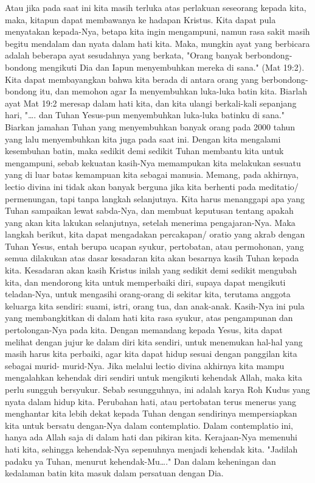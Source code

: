 Atau jika pada saat ini kita masih terluka atas perlakuan seseorang kepada kita, maka, kitapun dapat membawanya ke hadapan Kristus. Kita dapat pula menyatakan kepada-Nya, betapa kita ingin mengampuni, namun rasa sakit masih begitu mendalam dan nyata dalam hati kita. Maka, mungkin ayat yang berbicara adalah beberapa ayat sesudahnya yang berkata, "Orang banyak berbondong-bondong mengikuti Dia dan Iapun menyembuhkan mereka di sana." (Mat 19:2). Kita dapat membayangkan bahwa kita berada di antara orang yang berbondong-bondong itu, dan memohon agar Ia menyembuhkan luka-luka batin kita. Biarlah ayat Mat 19:2 meresap dalam hati kita, dan kita ulangi berkali-kali sepanjang hari, "…. dan Tuhan Yesus-pun menyembuhkan luka-luka batinku di sana." Biarkan jamahan Tuhan yang menyembuhkan banyak orang pada 2000 tahun yang lalu menyembuhkan kita juga pada saat ini. Dengan kita mengalami kesembuhan batin, maka sedikit demi sedikit Tuhan membantu kita untuk mengampuni, sebab kekuatan kasih-Nya memampukan kita melakukan sesuatu yang di luar batas kemampuan kita sebagai manusia.
Memang, pada akhirnya, lectio divina ini tidak akan banyak berguna jika kita berhenti pada meditatio/ permenungan, tapi tanpa langkah selanjutnya. Kita harus menanggapi apa yang Tuhan sampaikan lewat sabda-Nya, dan membuat keputusan tentang apakah yang akan kita lakukan selanjutnya, setelah menerima pengajaran-Nya. Maka langkah berikut, kita dapat mengadakan percakapan/ oratio yang akrab dengan Tuhan Yesus, entah berupa ucapan syukur, pertobatan, atau permohonan, yang semua dilakukan atas dasar kesadaran kita akan besarnya kasih Tuhan kepada kita. Kesadaran akan kasih Kristus inilah yang sedikit demi sedikit mengubah kita, dan mendorong kita untuk memperbaiki diri, supaya dapat mengikuti teladan-Nya, untuk mengasihi orang-orang di sekitar kita, terutama anggota keluarga kita sendiri: suami, istri, orang tua, dan anak-anak. Kasih-Nya ini pula yang membangkitkan di dalam hati kita rasa syukur, atas pengampunan dan pertolongan-Nya pada kita. Dengan memandang kepada Yesus, kita dapat melihat dengan jujur ke dalam diri kita sendiri, untuk menemukan hal-hal yang masih harus kita perbaiki, agar kita dapat hidup sesuai dengan panggilan kita sebagai murid- murid-Nya.
Jika melalui lectio divina akhirnya kita mampu mengalahkan kehendak diri sendiri untuk mengikuti kehendak Allah, maka  kita perlu sungguh bersyukur. Sebab sesungguhnya, ini adalah karya Roh Kudus yang nyata dalam hidup kita. Perubahan hati, atau pertobatan terus menerus yang menghantar kita lebih dekat kepada Tuhan dengan sendirinya mempersiapkan kita untuk bersatu dengan-Nya dalam contemplatio. Dalam contemplatio ini, hanya ada Allah saja di dalam hati dan pikiran kita. Kerajaan-Nya memenuhi hati kita, sehingga kehendak-Nya sepenuhnya menjadi kehendak kita. "Jadilah padaku ya Tuhan, menurut kehendak-Mu…." Dan dalam keheningan dan kedalaman batin kita masuk dalam persatuan dengan Dia.
